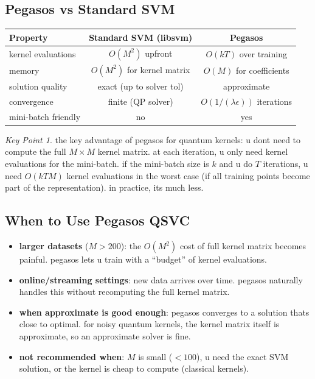 \documentclass[11pt,a4paper]{article}
\theoremstyle{definition}
\theoremstyle{remark}
\newtheorem*{keypoint}{Key Point}
\begin{document}
\subsection{Pegasos vs Standard SVM}

\begin{center}
\renewcommand{\arraystretch}{1.4}
\begin{tabular}{|l|c|c|}
\hline
\textbf{Property} & \textbf{Standard SVM (libsvm)} & \textbf{Pegasos} \\
\hline
kernel evaluations & $O(M^2)$ upfront & $O(kT)$ over training \\
\hline
memory & $O(M^2)$ for kernel matrix & $O(M)$ for coefficients \\
\hline
solution quality & exact (up to solver tol) & approximate \\
\hline
convergence & finite (QP solver) & $O(1/(\lambda \epsilon))$ iterations \\
\hline
mini-batch friendly & no & yes \\
\hline
\end{tabular}
\end{center}

\begin{keypoint}
the key advantage of pegasos for quantum kernels: u dont need to compute the full $M \times M$ kernel matrix. at each iteration, u only need kernel evaluations for the mini-batch. if the mini-batch size is $k$ and u do $T$ iterations, u need $O(kTM)$ kernel evaluations in the worst case (if all training points become part of the representation). in practice, its much less.
\end{keypoint}

\subsection{When to Use Pegasos QSVC}

\begin{itemize}[leftmargin=*]
    \item \textbf{larger datasets} ($M > 200$): the $O(M^2)$ cost of full kernel matrix becomes painful. pegasos lets u train with a ``budget'' of kernel evaluations.

    \item \textbf{online/streaming settings}: new data arrives over time. pegasos naturally handles this without recomputing the full kernel matrix.

    \item \textbf{when approximate is good enough}: pegasos converges to a solution thats close to optimal. for noisy quantum kernels, the kernel matrix itself is approximate, so an approximate solver is fine.

    \item \textbf{not recommended when}: $M$ is small ($< 100$), u need the exact SVM solution, or the kernel is cheap to compute (classical kernels).
\end{itemize}
\end{document}
